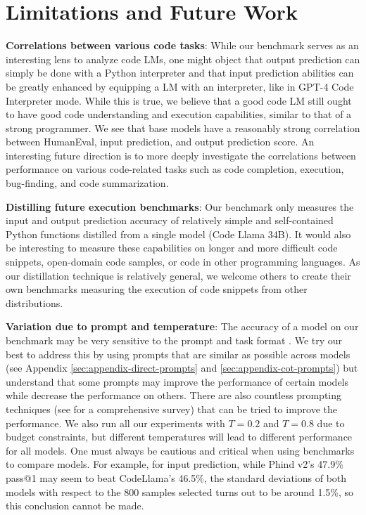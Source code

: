 
\section{Limitations and Future Work} \label{sec:limitations-future-work}

\textbf{Correlations between various code tasks}: While our benchmark serves as an interesting lens to analyze code LMs, one might object that output prediction can simply be done with a Python interpreter and that input prediction abilities can be greatly enhanced by equipping a LM with an interpreter, like in GPT-4 Code Interpreter mode. While this is true, we believe that a good code LM still ought to have good code understanding and execution capabilities, similar to that of a strong programmer. We see that base models have a reasonably strong correlation between HumanEval, input prediction, and output prediction score. An interesting future direction is to more deeply investigate the correlations between performance on various code-related tasks such as code completion, execution, bug-finding, and code summarization.

\textbf{Distilling future execution benchmarks}: Our benchmark only measures the input and output prediction accuracy of relatively simple and self-contained Python functions distilled from a single model (Code Llama 34B). It would also be interesting to measure these capabilities on longer and more difficult code snippets, open-domain code samples, or code in other programming languages. As our distillation technique is relatively general, we welcome others to create their own benchmarks measuring the execution of code snippets from other distributions.

\textbf{Variation due to prompt and temperature}: The accuracy of a model on our benchmark may be very sensitive to the prompt and task format \citep{mizrahi2023state}. We try our best to address this by using prompts that are similar as possible across models (see Appendix \ref{sec:appendix-direct-prompts} and \ref{sec:appendix-cot-prompts}) but understand that some prompts may improve the performance of certain models while decrease the performance on others. There are also countless prompting techniques (see \citep{liu2023pre} for a comprehensive survey) that can be tried to improve the performance. We also run all our experiments with $T=0.2$ and $T=0.8$ due to budget constraints, but different temperatures will lead to different performance for all models. One must always be cautious and critical when using benchmarks to compare models. For example, for input prediction, while Phind v2's 47.9\% pass@1 may seem to beat CodeLlama's 46.5\%, the standard deviations of both models with respect to the $800$ samples selected turns out to be around 1.5\%, so this conclusion cannot be made.

